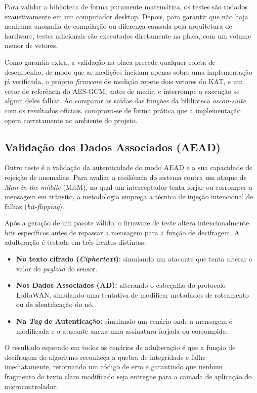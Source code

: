 Para validar a biblioteca de forma puramente matemática, os testes são rodados exaustivamente em um computador desktop. Depois, para garantir que não haja nenhuma anomalia de compilação ou diferença causada pela arquitetura de hardware, testes adicionais são executados diretamente na placa, com um volume menor de vetores.

Como garantia extra, a validação na placa precede qualquer coleta de desempenho, de modo que as medições incidam apenas sobre uma implementação já verificada, o próprio \textit{firmware} de medição repete dois vetores do KAT, e um vetor de referência do AES-GCM, antes de medir, e interrompe a execução se algum deles falhar. Ao comparar as saídas das funções da biblioteca \textit{ascon-suite} com os resultados oficiais, comprova-se de forma prática que a implementação opera corretamente no ambiente do projeto.


\subsection{Validação dos Dados Associados (AEAD)}
Outro teste é a validação da autenticidade do modo AEAD e a sua capacidade de rejeição de anomalias. Para avaliar a resiliência do sistema contra um ataque de \textit{Man-in-the-middle} (MitM), no qual um interceptador tenta forjar ou corromper a mensagem em trânsito, a metodologia emprega a técnica de injeção intencional de falhas (\textit{bit-flipping}).

Após a geração de um pacote válido, o firmware de teste altera intencionalmente bits específicos antes de repassar a mensagem para a função de decifragem. A adulteração é testada em três frentes distintas.
\begin{itemize}
\item \textbf{No texto cifrado (\textit{Ciphertext}):} simulando um atacante que tenta alterar o valor do \textit{payload} do sensor.
\item \textbf{Nos Dados Associados (AD):} alterando o cabeçalho do protocolo LoRaWAN, simulando uma tentativa de modificar metadados de roteamento ou de identificação do nó.
\item \textbf{Na \textit{Tag} de Autenticação:} simulando um cenário onde a mensagem é modificada e o atacante anexa uma assinatura forjada ou corrompida.
\end{itemize}

O resultado esperado em todos os cenários de adulteração é que a função de decifragem do algoritmo reconheça a quebra de integridade e falhe imediatamente, retornando um código de erro e garantindo que nenhum fragmento do texto claro modificado seja entregue para a camada de aplicação do microcontrolador.

